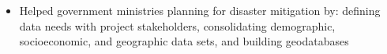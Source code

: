 \documentclass[letterpaper]{article}
\newcommand{\employer}[4]{
        \vspace{5pt}
        \textbf{#1}  %
        \hfill #2\\  %
        \textit{#3}  %
        \hfill #4\\  %
        \vspace{1mm}
    }
\newcommand{\jobintro}[1]{
        #1
        \vspace{5pt}
    }
\newenvironment{jobtasklist}
        {
            \vspace{-12pt}
            \begin{itemize} \itemsep 0pt
        }{
            \end{itemize}
            \vspace{-3pt}
        }
\begin{document}
\begin{jobtasklist}
    \item Helped government ministries planning for disaster mitigation by:
    defining data needs with project stakeholders, consolidating demographic,
    socioeconomic, and geographic data sets, and building 
    geodatabases
    
\end{jobtasklist}


% 
% 
% 
% 
% 
% 
\end{document}
